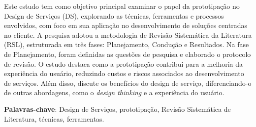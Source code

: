 \begin{resumo}
Este estudo tem como objetivo principal examinar o papel da prototipação no Design de Serviços (DS), explorando as técnicas, ferramentas e processos envolvidos, com foco em sua aplicação no desenvolvimento de soluções centradas no cliente. A pesquisa adotou a metodologia de Revisão Sistemática da Literatura (RSL), estruturada em três fases: Planejamento, Condução e Resultados. Na fase de Planejamento, foram definidas as questões de pesquisa e elaborado o protocolo de revisão. O estudo destaca como a prototipação contribui para a melhoria da experiência do usuário, reduzindo custos e riscos associados ao desenvolvimento de serviços. Além disso, discute os benefícios do design de serviço, diferenciando-o de outras abordagens, como o \textit{design thinking} e a experiência do usuário.

 \vspace{\onelineskip}
    
 \noindent
 \textbf{Palavras-chave}: Design de Serviços, prototipação, Revisão Sistemática de Literatura, técnicas, ferramentas.
\end{resumo}

